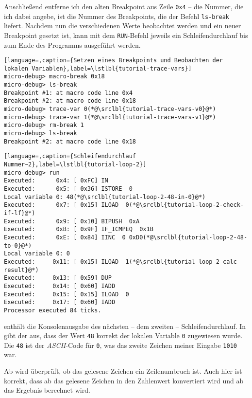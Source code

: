 Anschließend entferne ich den alten Breakpoint aus Zeile \texttt{0x4} -- die Nummer, die ich dabei angebe, ist die Nummer des Breakpoints, die der Befehl \texttt{ls-break} liefert. Nachdem nun die verschiedenen Werte beobachtet werden und ein neuer Breakpoint gesetzt ist, kann mit dem \texttt{RUN}-Befehl jeweils ein Schleifendurchlauf bis zum Ende des Programms ausgeführt werden.

\begin{lstlisting}[language=,caption={Setzen eines Breakpoints und Beobachten der lokalen Variablen},label=\lstlbl{tutorial-trace-vars}]
micro-debug> macro-break 0x18
micro-debug> ls-break
Breakpoint #1: at macro code line 0x4
Breakpoint #2: at macro code line 0x18
micro-debug> trace-var 0(*@\srclbl{tutorial-trace-vars-v0}@*)
micro-debug> trace-var 1(*@\srclbl{tutorial-trace-vars-v1}@*)
micro-debug> rm-break 1
micro-debug> ls-break
Breakpoint #2: at macro code line 0x18
\end{lstlisting}

\begin{lstlisting}[language=,caption={Schleifendurchlauf Nummer~2},label=\lstlbl{tutorial-loop-2}]
micro-debug> run
Executed:      0x4: [ 0xFC] IN 
Executed:      0x5: [ 0x36] ISTORE  0
Local variable 0: 48(*@\srclbl{tutorial-loop-2-48-in-0}@*)
Executed:      0x7: [ 0x15] ILOAD  0(*@\srclbl{tutorial-loop-2-check-if-lf}@*)
Executed:      0x9: [ 0x10] BIPUSH  0xA
Executed:      0xB: [ 0x9F] IF_ICMPEQ  0x1B
Executed:      0xE: [ 0x84] IINC  0 0xD0(*@\srclbl{tutorial-loop-2-48-to-0}@*)
Local variable 0: 0
Executed:     0x11: [ 0x15] ILOAD  1(*@\srclbl{tutorial-loop-2-calc-result}@*)
Executed:     0x13: [ 0x59] DUP 
Executed:     0x14: [ 0x60] IADD 
Executed:     0x15: [ 0x15] ILOAD  0
Executed:     0x17: [ 0x60] IADD 
Processor executed 84 ticks.
\end{lstlisting}

 enthält die Konsolenausgabe des nächsten -- dem zweiten -- Schleifendurchlauf. In  gibt der \md aus, dass der Wert \texttt{48} korrekt der lokalen Variable \texttt{0} zugewiesen wurde. Die \texttt{48} ist der \emph{ASCII}-Code für \texttt{0}, was das zweite Zeichen meiner Eingabe \texttt{1010} war.

Ab  wird überprüft, ob das gelesene Zeichen ein Zeilenumbruch ist. Auch hier ist korrekt, dass ab  das gelesene Zeichen in den Zahlenwert konvertiert wird und ab  das Ergebnis berechnet wird.

